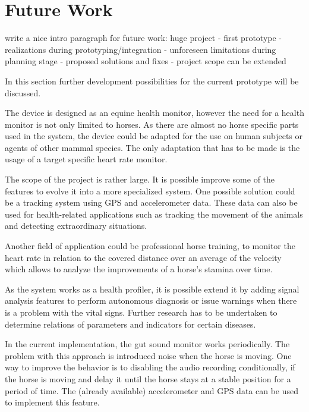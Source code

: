 \chapter{Future Work}
\TODO{}write a nice intro paragraph for future work: huge project - first prototype - realizations during prototyping/integration - unforeseen limitations during planning stage - proposed solutions and fixes - project scope can be extended

In this section further development possibilities for the current prototype will be discussed.

The device is designed as an equine health monitor, however the need for a health monitor is not only limited to horses. As there are almost no horse specific parts used in the system, the device could be adapted for the use on human subjects or agents of other mammal species. The only adaptation that has to be made is the usage of a target specific heart rate monitor. 

The scope of the project is rather large. It is possible improve some of the features to evolve it into a more specialized system. One possible solution could be a tracking system using GPS and accelerometer data. These data can also be used for health-related applications such as tracking the movement of the animals and detecting extraordinary situations. 

Another field of application could be professional horse training, to monitor the heart rate in relation to the covered distance over an average of the velocity which allows to analyze the improvements of a horse’s stamina over time.

As the system works as a health profiler, it is possible extend it by adding signal analysis features to perform autonomous diagnosis or issue warnings when there is a problem with the vital signs. Further research has to be undertaken to determine relations of parameters and indicators for certain diseases.

In the current implementation, the gut sound monitor works periodically. The problem with this approach is introduced noise when the horse is moving. One way to improve the behavior is to disabling the audio recording conditionally, if the horse is moving and delay it until the horse stays at a stable position for a period of time. The (already available) accelerometer and GPS data can be used to implement this feature.

